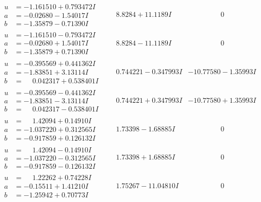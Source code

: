 \documentclass[1p]{elsarticle_modified}
\theoremstyle{definition}
\begin{document}
$$\begin{array}{c|c|c}
\begin{aligned}
u &= -1.161510 + 0.793472 I \\
a &= -0.02680 - 1.54017 I \\
b &= -1.35879 - 0.71390 I\end{aligned}
 & \phantom{-}8.8284 + 11.1189 I & \phantom{-0.000000 } 0 \\ \hline\begin{aligned}
u &= -1.161510 - 0.793472 I \\
a &= -0.02680 + 1.54017 I \\
b &= -1.35879 + 0.71390 I\end{aligned}
 & \phantom{-}8.8284 - 11.1189 I & \phantom{-0.000000 } 0 \\ \hline\begin{aligned}
u &= -0.395569 + 0.441362 I \\
a &= -1.83851 + 3.13114 I \\
b &= \phantom{-}0.042317 + 0.538401 I\end{aligned}
 & \phantom{-}0.744221 - 0.347993 I & -10.77580 - 1.35993 I \\ \hline\begin{aligned}
u &= -0.395569 - 0.441362 I \\
a &= -1.83851 - 3.13114 I \\
b &= \phantom{-}0.042317 - 0.538401 I\end{aligned}
 & \phantom{-}0.744221 + 0.347993 I & -10.77580 + 1.35993 I \\ \hline\begin{aligned}
u &= \phantom{-}1.42094 + 0.14910 I \\
a &= -1.037220 + 0.312565 I \\
b &= -0.917859 + 0.126132 I\end{aligned}
 & \phantom{-}1.73398 - 1.68885 I & \phantom{-0.000000 } 0 \\ \hline\begin{aligned}
u &= \phantom{-}1.42094 - 0.14910 I \\
a &= -1.037220 - 0.312565 I \\
b &= -0.917859 - 0.126132 I\end{aligned}
 & \phantom{-}1.73398 + 1.68885 I & \phantom{-0.000000 } 0 \\ \hline\begin{aligned}
u &= \phantom{-}1.22262 + 0.74228 I \\
a &= -0.15511 + 1.41210 I \\
b &= -1.25942 + 0.70773 I\end{aligned}
 & \phantom{-}1.75267 - 11.04810 I & \phantom{-0.000000 } 0 \\ \hline\begin{aligned}

\end{aligned}
\end{array}$$
\end{document}
